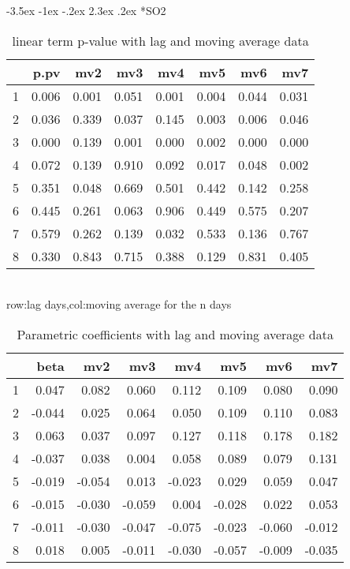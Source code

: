 \documentclass[a4paper, 12pt]{article}
\makeatletter
\def\large{\fontsize{14}{20}\selectfont}
\renewcommand\subsection{\@startsection {subsection}{1}{\z@}%
                                   {-3.5ex \@plus -1ex \@minus -.2ex}%
                                   {2.3ex \@plus.2ex}%
                                   {\centering\normalfont\large\bfseries}}
\makeatother
\begin{document}
\subsection*{SO2}
\begin{table}[h]
\centering
\caption{linear term p-value with lag and moving average data}
\begin{tabular}{rrrrrrrr}
  \hline
 & p.pv & mv2 & mv3 & mv4 & mv5 & mv6 & mv7 \\
  \hline
1 & 0.006 & 0.001 & 0.051 & 0.001 & 0.004 & 0.044 & 0.031 \\
  2 & 0.036 & 0.339 & 0.037 & 0.145 & 0.003 & 0.006 & 0.046 \\
  3 & 0.000 & 0.139 & 0.001 & 0.000 & 0.002 & 0.000 & 0.000 \\
  4 & 0.072 & 0.139 & 0.910 & 0.092 & 0.017 & 0.048 & 0.002 \\
  5 & 0.351 & 0.048 & 0.669 & 0.501 & 0.442 & 0.142 & 0.258 \\
  6 & 0.445 & 0.261 & 0.063 & 0.906 & 0.449 & 0.575 & 0.207 \\
  7 & 0.579 & 0.262 & 0.139 & 0.032 & 0.533 & 0.136 & 0.767 \\
  8 & 0.330 & 0.843 & 0.715 & 0.388 & 0.129 & 0.831 & 0.405 \\
   \hline
\end{tabular}
\\row:lag days,col:moving average for the n days
\end{table}

\begin{table}[h]
\centering
\caption{Parametric coefficients with lag and moving average data}
\begin{tabular}{rrrrrrrr}
  \hline
 & beta & mv2 & mv3 & mv4 & mv5 & mv6 & mv7 \\
  \hline
1 & 0.047 & 0.082 & 0.060 & 0.112 & 0.109 & 0.080 & 0.090 \\
  2 & -0.044 & 0.025 & 0.064 & 0.050 & 0.109 & 0.110 & 0.083 \\
  3 & 0.063 & 0.037 & 0.097 & 0.127 & 0.118 & 0.178 & 0.182 \\
  4 & -0.037 & 0.038 & 0.004 & 0.058 & 0.089 & 0.079 & 0.131 \\
  5 & -0.019 & -0.054 & 0.013 & -0.023 & 0.029 & 0.059 & 0.047 \\
  6 & -0.015 & -0.030 & -0.059 & 0.004 & -0.028 & 0.022 & 0.053 \\
  7 & -0.011 & -0.030 & -0.047 & -0.075 & -0.023 & -0.060 & -0.012 \\
  8 & 0.018 & 0.005 & -0.011 & -0.030 & -0.057 & -0.009 & -0.035 \\
   \hline
\end{tabular}
\end{table}
\clearpage
\end{document}
